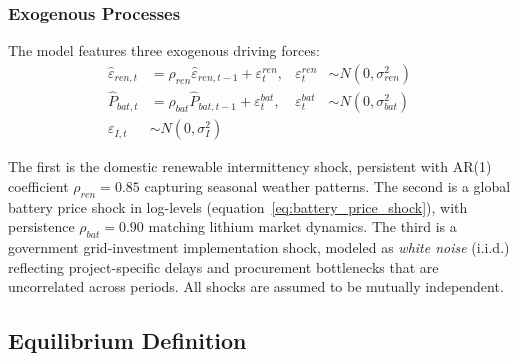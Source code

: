 \documentclass[12pt, a4paper]{article}
\begin{document}
\subsubsection{Exogenous Processes}

The model features three exogenous driving forces:
\begin{align}
\hat{\varepsilon}_{ren,t} &= \rho_{ren} \hat{\varepsilon}_{ren,t-1} + \varepsilon^{ren}_t, & \varepsilon^{ren}_t &\sim N(0, \sigma^2_{ren}) \label{eq:shock_ren} \\
\hat{P}_{bat,t} &= \rho_{bat} \hat{P}_{bat,t-1} + \varepsilon^{bat}_t, & \varepsilon^{bat}_t &\sim N(0, \sigma^2_{bat}) \label{eq:shock_bat} \\
\varepsilon_{I,t} &\sim N(0, \sigma^2_I) \label{eq:shock_gov}
\end{align}

The first is the domestic renewable intermittency shock, persistent with AR(1) coefficient $\rho_{ren} = 0.85$ capturing seasonal weather patterns. The second is a global battery price shock in log-levels (equation~\ref{eq:battery_price_shock}), with persistence $\rho_{bat} = 0.90$ matching lithium market dynamics. The third is a government grid-investment implementation shock, modeled as \textit{white noise} (i.i.d.) reflecting project-specific delays and procurement bottlenecks that are uncorrelated across periods. All shocks are assumed to be mutually independent.

\subsection{Equilibrium Definition}
\end{document}
